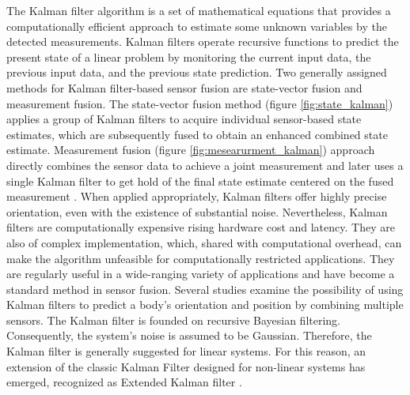 The Kalman filter algorithm is a set of mathematical equations that provides a computationally efficient approach to estimate some unknown variables by the detected measurements\cite{welch1995introduction}. Kalman filters operate recursive functions to predict the present state of a linear problem by monitoring the current input data, the previous input data, and the previous state prediction.  Two generally assigned methods for Kalman filter-based sensor fusion are state-vector fusion and measurement fusion. The state-vector fusion method (figure \ref{fig:state_kalman}) applies a group of Kalman filters to acquire individual sensor-based state estimates, which are subsequently fused to obtain an enhanced combined state estimate. Measurement fusion (figure \ref{fig:mesearurment_kalman}) approach directly combines the sensor data to achieve a joint measurement and later uses a single Kalman filter to get hold of the final state estimate centered on the fused measurement \cite{mosallaei2007process}.
When applied appropriately, Kalman filters offer highly precise orientation, even with the existence of substantial noise. Nevertheless, Kalman filters are computationally expensive rising hardware cost and latency. They are also of complex implementation, which, shared with computational overhead, can make the algorithm unfeasible for computationally restricted applications. They are regularly useful in a wide-ranging variety of applications and have become a standard method in sensor fusion. Several studies examine the possibility of using Kalman filters to predict a body’s orientation and position by combining multiple sensors. The Kalman filter is founded on recursive Bayesian filtering.
Consequently, the system’s noise is assumed to be Gaussian. Therefore, the Kalman filter is generally suggested for linear systems. For this reason, an extension of the classic Kalman Filter designed for non-linear systems has emerged, recognized as Extended Kalman filter \cite{wilson2019formulation}.


